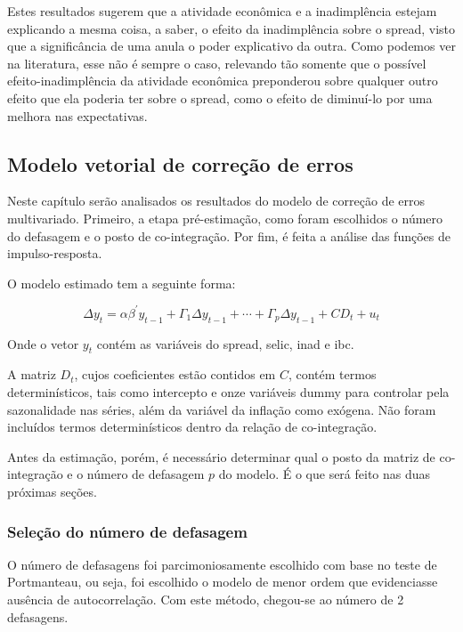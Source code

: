 \documentclass[a4paper,
               article,
               12pt,
               openany,
               oneside,
               english,
               brazil]{abntex2}
\numberwithin{equation}{section}
\begin{document}
    Estes resultados sugerem que a atividade econômica e a inadimplência estejam explicando a mesma coisa, a saber, o efeito da inadimplência sobre o spread, visto que a significância de uma anula o poder explicativo da outra. Como podemos ver na literatura, esse não é sempre o caso, relevando tão somente que o possível efeito-inadimplência da atividade econômica preponderou sobre qualquer outro efeito que ela poderia ter sobre o spread, como o efeito de diminuí-lo por uma melhora nas expectativas.

    \subsection{Modelo vetorial de correção de erros}

    Neste capítulo serão analisados os resultados do modelo de correção de erros multivariado. Primeiro, a etapa pré-estimação, como foram escolhidos o número do defasagem e o posto de co-integração. Por fim, é feita a análise das funções de impulso-resposta.

    O modelo estimado tem a seguinte forma:

    \begin{equation}
        \Delta y_t = \alpha \beta^{'} y_{t-1}+ \Gamma_1 \Delta y_{t-1} + \cdots + \Gamma_{p} \Delta y_{t-1} + CD_t + u_t \label{vecm_spread}
    \end{equation}

    Onde o vetor $ y_t $ contém as variáveis do spread, selic, inad e ibc.
    
    A matriz $ D_t $, cujos coeficientes estão contidos em $ C $, contém termos determinísticos, tais como intercepto e onze variáveis dummy para controlar pela sazonalidade nas séries, além da variável da inflação como exógena. Não foram incluídos termos determinísticos dentro da relação de co-integração.

    Antes da estimação, porém, é necessário determinar qual o posto da matriz de co-integração e o número de defasagem $ p $ do modelo. É o que será feito nas duas próximas seções.

    \subsubsection{Seleção do número de defasagem}

    O número de defasagens foi parcimoniosamente escolhido com base no teste de Portmanteau, ou seja, foi escolhido o modelo de menor ordem que evidenciasse ausência de autocorrelação. Com este método, chegou-se ao número de 2 defasagens.
\end{document}
